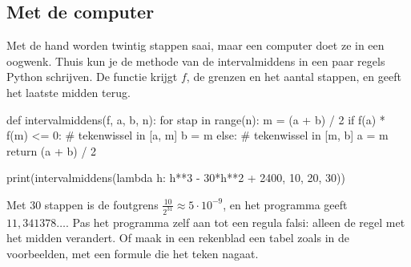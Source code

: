 
\subsection{Met de computer}

Met de hand worden twintig stappen saai, maar een computer doet ze in een oogwenk. Thuis kun je de methode van de intervalmiddens in een paar regels Python schrijven. De functie krijgt $f$, de grenzen en het aantal stappen, en geeft het laatste midden terug.

\begin{python}
def intervalmiddens(f, a, b, n):
    for stap in range(n):
        m = (a + b) / 2
        if f(a) * f(m) <= 0:     # tekenwissel in [a, m]
            b = m
        else:                    # tekenwissel in [m, b]
            a = m
    return (a + b) / 2

print(intervalmiddens(lambda h: h**3 - 30*h**2 + 2400, 10, 20, 30))
\end{python}

Met 30 stappen is de foutgrens $\frac{10}{2^{31}} \approx 5 \cdot 10^{-9}$, en het programma geeft $11{,}341378\ldots$. Pas het programma zelf aan tot een regula falsi: alleen de regel met het midden verandert. Of maak in een rekenblad een tabel zoals in de voorbeelden, met een formule die het teken nagaat.

\opdrachtenkop

\begin{oefeningen}




















\end{oefeningen}

